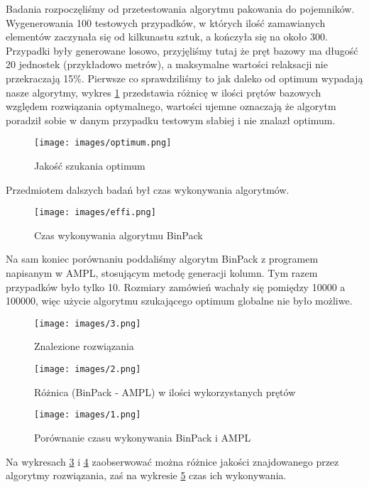 Badania rozpoczęliśmy od przetestowania algorytmu pakowania do pojemników. Wygenerowania 100 testowych przypadków, w których ilość zamawianych elementów zaczynała się od kilkunastu sztuk, a kończyła się na około 300. Przypadki były generowane losowo, przyjęliśmy tutaj że pręt bazowy ma długość 20 jednostek (przykładowo metrów), a maksymalne wartości relaksacji nie przekraczają 15\%. Pierwsze co sprawdziliśmy to jak daleko od optimum wypadają nasze algorytmy, wykres \ref{fig:optimum} przedstawia różnicę w ilości prętów bazowych względem rozwiązania optymalnego, wartości ujemne oznaczają że algorytm poradził sobie w danym przypadku testowym słabiej i nie znalazł optimum.

\begin{figure}[ht]
    \texttt{[image: images/optimum.png]}
    \caption{Jakość szukania optimum}
    \label{fig:optimum}
\end{figure}

 Przedmiotem dalszych badań był czas wykonywania algorytmów.

\begin{figure}[ht]
    \texttt{[image: images/effi.png]}
    \caption{Czas wykonywania algorytmu BinPack}
    \label{fig:effi}
\end{figure}

Na sam koniec porównaniu poddaliśmy algorytm BinPack z programem napisanym w AMPL, stosującym metodę generacji kolumn. Tym razem przypadków było tylko 10. Rozmiary zamówień wachały się pomiędzy 10000 a 100000, więc użycie algorytmu szukającego optimum globalne nie było możliwe.

\begin{figure}[ht]
    \texttt{[image: images/3.png]}
    \caption{Znalezione rozwiązania}
    \label{fig:optimum2}
\end{figure}

\begin{figure}[ht]
    \texttt{[image: images/2.png]}
    \caption{Różnica (BinPack - AMPL) w ilości wykorzystanych prętów}
    \label{fig:optimumDiff}
\end{figure}

\begin{figure}[ht]
    \texttt{[image: images/1.png]}
    \caption{Porównanie czasu wykonywania BinPack i AMPL}
    \label{fig:time}
\end{figure}

Na wykresach \ref{fig:optimum2} i \ref{fig:optimumDiff} zaobserwować można różnice jakości znajdowanego przez algorytmy rozwiązania, zaś na wykresie \ref{fig:time} czas ich wykonywania.